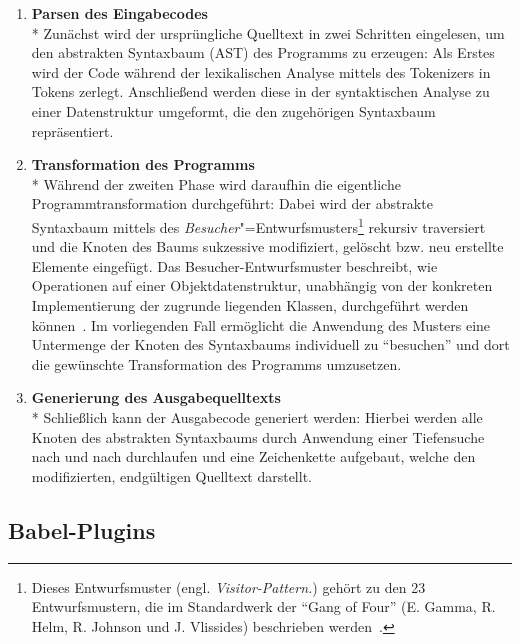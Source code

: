 \begin{enumerate}
  \item \textbf{Parsen des Eingabecodes}\\*
    Zunächst wird der ursprüngliche Quelltext in zwei Schritten eingelesen, um den abstrakten Syntaxbaum (AST) des Programms zu erzeugen: Als Erstes wird der Code während der lexikalischen Analyse mittels des Tokenizers in Tokens zerlegt. Anschließend werden diese in der syntaktischen Analyse zu einer Datenstruktur umgeformt, die den zugehörigen Syntaxbaum repräsentiert.
    \\

  \item \textbf{Transformation des Programms}\\*
    Während der zweiten Phase wird daraufhin die eigentliche Programmtransformation durchgeführt: Dabei wird der abstrakte Syntaxbaum mittels des \textit{Besucher}"=Entwurfsmusters\footnote{Dieses Entwurfsmuster (engl. \textit{Visitor-Pattern.}) gehört zu den 23 Entwurfsmustern, die im Standardwerk  der \enquote{Gang of Four} (E. Gamma, R. Helm, R. Johnson und J. Vlissides) beschrieben werden~\autocite[306\psqq]{GAMMA:1994}.} rekursiv traversiert und die Knoten des Baums sukzessive modifiziert, gelöscht bzw. neu erstellte Elemente eingefügt. Das Besucher-Entwurfsmuster beschreibt, wie Operationen auf einer Objektdatenstruktur, unabhängig von der konkreten Implementierung der zugrunde liegenden Klassen, durchgeführt werden können~\autocite[634\psq]{Freeman:2004}. Im vorliegenden Fall ermöglicht die Anwendung des Musters eine Untermenge der Knoten des Syntaxbaums individuell zu \enquote{besuchen} und dort die gewünschte Transformation des Programms umzusetzen.
    \\

  \item \textbf{Generierung des Ausgabequelltexts}\\*
    Schließlich kann der Ausgabecode generiert werden: Hierbei werden alle Knoten des abstrakten Syntaxbaums durch Anwendung einer Tiefensuche nach und nach durchlaufen und eine Zeichenkette aufgebaut, welche den modifizierten, endgültigen Quelltext darstellt.
\end{enumerate}

\subsection{Babel-Plugins}
\label{subsection:babel-plugins}

